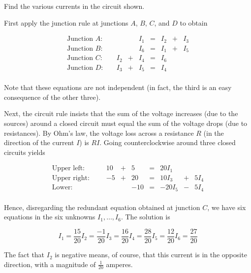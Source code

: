 \documentclass{ximera}
\begin{document}
\begin{example}\label{001817}

Find the various currents in the circuit shown.

\begin{explanation}
%	
  First apply the junction rule at junctions $A$, $B$, $C$, and $D$ to obtain


$$\begin{array}{lccccccc}
	\mbox{Junction } A:\quad &&& I_1 & = & I_2 &+& I_3 \\
	\mbox{Junction } B:\quad &&& I_6 & = & I_1 &+& I_5 \\
	\mbox{Junction } C:\quad & I_2 &+& I_4 & = & I_6 && \\
	\mbox{Junction } D:\quad & I_3 &+& I_5 & = & I_4&& \\
\end{array}$$

Note that these equations are not independent (in fact, the third is an easy consequence of the other three).

Next, the circuit rule insists that the sum of the voltage increases (due to the sources) around a closed circuit must equal the sum of the voltage drops (due to resistances). By Ohm's law, the voltage loss across a resistance $R$ (in the direction of the current $I$) is $RI$. Going counterclockwise around three closed circuits yields

$$\begin{array}{lcccccccc}
	\mbox{Upper left: } \quad\quad  &10 & + & 5 & = & 20I_1 && \\
	\mbox{Upper right: } &-5 & +& 20 & = & 10I_3& +& 5I_4 \\
	\mbox{Lower: } && &-10 & = & -20I_5 &-& 5I_4 \\
\end{array}$$

Hence, disregarding the redundant equation obtained at junction $C$, we have six equations in the six unknowns $I_1, \dots, I_6$. The solution is

$$	I_1 = \frac{15}{20} I_2 = \frac{-1}{20}I_3 = \frac{16}{20} I_4 = \frac{28}{20}I_5 = \frac{12}{20}I_6 = \frac{27}{20}$$

The fact that $I_2$ is negative means, of course, that this current is in the opposite direction, with a magnitude of $\frac{1}{20}$ amperes.

\end{explanation}

\end{example}
\end{document}

